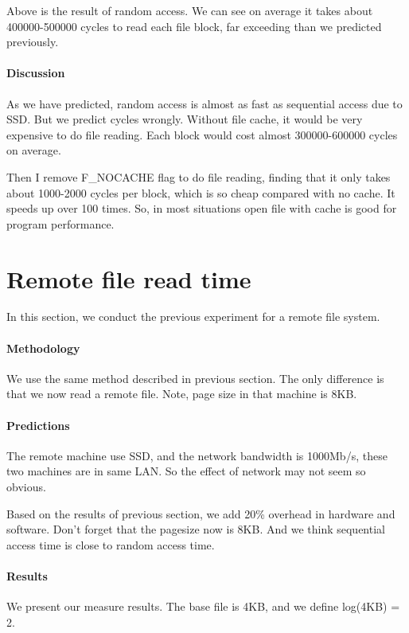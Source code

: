 Above is the result of random access. We can see on average it takes about 400000-500000 cycles to read each file block, far exceeding than we predicted previously.

\paragraph{Discussion}
As we have predicted, random access is almost as fast as sequential access due to SSD. But we predict cycles wrongly. Without file cache, it would be very expensive to do file reading. Each block would cost almost 300000-600000 cycles on average.

Then I remove F\_NOCACHE flag to do file reading, finding that it only takes about 1000-2000 cycles per block, which is so cheap compared with no cache. It speeds up over 100 times. So, in most situations open file with cache is good for program performance.

\section{Remote file read time}
In this section, we conduct the previous experiment for a remote file system.

\paragraph{Methodology}
We use the same method described in previous section. The only difference is that we now read a remote file. Note, page size in that machine is 8KB.

\paragraph{Predictions}
The remote machine use SSD, and the network bandwidth is 1000Mb/s, these two machines are in same LAN. So the effect of network may not seem so obvious.

Based on the results of previous section, we add 20\% overhead in hardware and software. Don't forget that the pagesize now is 8KB. And we think sequential access time is close to random access time. 

\paragraph{Results}

We present our measure results. The base file is 4KB, and we define log(4KB) = 2.

